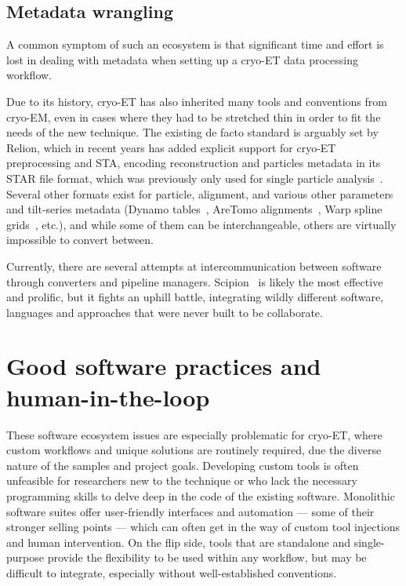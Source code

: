 \subsection{Metadata wrangling}\label{metadata}

A common symptom of such an ecosystem is that significant time and effort is lost in dealing with metadata when setting up a cryo-ET data processing workflow.

Due to its history, cryo-ET has also inherited many tools and conventions from cryo-EM, even in cases where they had to be stretched thin in order to fit the needs of the new technique.
The existing de facto standard is arguably set by Relion, which in recent years has added explicit support for cryo-ET preprocessing and STA, encoding reconstruction and particles metadata in its STAR file format, which was previously only used for single particle analysis~\cite{zivanovBayesianApproachSingleparticle2022,burtImageProcessingPipeline2024}.
Several other formats exist for particle, alignment, and various other parameters and tilt-series metadata (Dynamo tables~\cite{castano-diezDynamoCatalogueGeometrical2017}, AreTomo alignments~\cite{zhengAreTomoIntegratedSoftware2022}, Warp spline grids~\cite{tegunovRealtimeCryoelectronMicroscopy2019}, etc.), and while some of them can be interchangeable, others are virtually impossible to convert between.

Currently, there are several attempts at intercommunication between software through converters and pipeline managers.
Scipion~\cite{delarosa-trevinScipionSoftwareFramework2016} is likely the most effective and prolific, but it fights an uphill battle, integrating wildly different software, languages and approaches that were never built to be collaborate.


\section{Good software practices and human-in-the-loop}

These software ecosystem issues are especially problematic for cryo-ET, where custom workflows and unique solutions are routinely required, due the diverse nature of the samples and project goals.
Developing custom tools is often unfeasible for researchers new to the technique or who lack the necessary programming skills to delve deep in the code of the existing software.
Monolithic software suites offer user-friendly interfaces and automation --- some of their stronger selling points --- which can often get in the way of custom tool injections and human intervention.
On the flip side, tools that are standalone and single-purpose provide the flexibility to be used within any workflow, but may be difficult to integrate, especially without well-established conventions.

